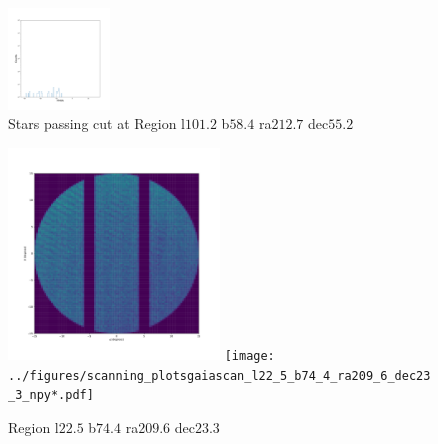 \documentclass[12pt,prd]{article}
\begin{document}
\begin{figure}[h!]
\includegraphics[width=0.24\textwidth]{../figures/stars_passing_cut_rahistgaiascan_l101_2_b58_4_ra212_7_dec55_2_npy_17.pdf}
\caption{Stars passing cut at Region l$101.2$ b$58.4$ ra$212.7$ dec$55.2$}
\end{figure}


\begin{figure}[h!]
\centering
\includegraphics[width=0.5\textwidth]{../figures/histogram2dgaiascan_l22_5_b74_4_ra209_6_dec23_3_npy.pdf}
\texttt{[image: ../figures/scanning\_plotsgaiascan\_l22\_5\_b74\_4\_ra209\_6\_dec23\_3\_npy*.pdf]}
\caption{Region l$22.5$ b$74.4$ ra$209.6$ dec$23.3$}
\end{figure}
\end{document}
